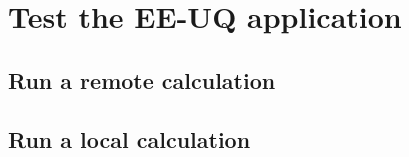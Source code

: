 \section{Test the EE-UQ application}

\subsection{Run a remote calculation}

\subsection{Run a local calculation}

